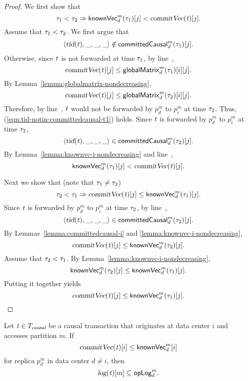 \begin{proof} \label{proof:heartbeat-forwarding-order}
  We first show that
  \[
    \realtime_{1} < \realtime_{2} \implies \knownVC^{m}_{d}(\realtime_{1})[j] < \commitVC(\tvar)[j].
  \]
  Assume that $\tau_{1} < \tau_{2}$.
  We first argue that
  \begin{align}
    \langle \textsl{tid}(\mathit{t}), \_, \_, \_ \rangle \notin {\sf committedCausal}^{m}_{d}(\tau_{1})[j].
    \label{eqn:tid-notin-committedcausal-t1}
  \end{align}
  Otherwise, since $\mathit{t}$ is not forwarded at time $\tau_{1}$,
  by line~\code{\ref{alg:unistore-replication}}{\ref{line:forward-txs}},
  \[
    \textsl{commitVec}(\mathit{t})[j] \le {\sf globalMatrix}^{m}_{d}(\tau_{1})[i][j].
  \]
  By Lemma~\ref{lemma:globalmatrix-nondecreasing},
  \[
    \textsl{commitVec}(\mathit{t})[j] \le {\sf globalMatrix}^{m}_{d}(\tau_{2})[i][j].
  \]
  Therefore, by line~\code{\ref{alg:unistore-replication}}{\ref{line:forward-txs}},
  $\mathit{t}$ would not be forwarded by $p^{m}_{d}$ to $p^{m}_{i}$ at time $\tau_{2}$.
  Thus, (\ref{eqn:tid-notin-committedcausal-t1}) holds.
  Since $\mathit{t}$ is forwarded by $p^{m}_{d}$ to $p^{m}_{i}$ at time $\tau_{2}$,
  \[
    \langle \textsl{tid}(\mathit{t}), \_, \_, \_ \rangle \in {\sf committedCausal}^{m}_{d}(\tau_{2})[j].
  \]
  By Lemma~\ref{lemma:knownvc-i-nondecreasing}
  and line~\code{\ref{alg:unistore-replication}}{\ref{line:replicate-precondition}},
  \[
    {\sf knownVec}^{m}_{d}(\tau_{1})[j] < \textsl{commitVec}(\mathit{t})[j].
  \]

  Next we show that (note that $\tau_{1} \neq \tau_{2}$)
  \[
    \realtime_{2} < \realtime_{1} \implies \commitVC(\tvar)[j] \le \knownVC^{m}_{d}(\realtime_{1})[j].
  \]
  Since $\mathit{t}$ is forwarded by $p^{m}_{d}$ to $p^{m}_{i}$ at time $\tau_{2}$,
  by line~\code{\ref{alg:unistore-replication}}{\ref{line:forward-txs}},
  \[
    \langle \textsl{tid}(\mathit{t}), \_, \_, \_ \rangle \in {\sf committedCausal}^{m}_{d}(\tau_{2})[j].
  \]
  By Lemmas~\ref{lemma:committedcausal-i} and \ref{lemma:knownvc-i-nondecreasing},
  \[
    \textsl{commitVec}(\mathit{t})[j] \le {\sf knownVec}^{m}_{d}(\tau_{2})[j].
  \]
  Assume that $\tau_{2} < \tau_{1}$.
  By Lemma~\ref{lemma:knownvc-i-nondecreasing},
  \[
    {\sf knownVec}^{m}_{d}(\tau_{2})[j] \le {\sf knownVec}^{m}_{d}(\tau_{1})[j].
  \]
  Putting it together yields
  \[
    \textsl{commitVec}(\mathit{t})[j] \le {\sf knownVec}^{m}_{d}(\tau_{1})[j].
  \]
\end{proof}

\begin{applemma} \label{lemma:replication-knownvc}
  Let $\mathit{t} \in T_{\textsl{causal}}$ be a causal transaction
  that originates at data center $i$ and accesses partition $m$.
  If
  \[
    \textsl{commitVec}(\mathit{t})[i] \le {\sf knownVec}^{m}_{d}[i]
  \]
  for replica $p^{m}_{d}$ in data center $d \neq i$,
  then
  \[
    \textsl{log}(\mathit{t})[m] \subseteq {\sf opLog}^{m}_{d}.
  \]
\end{applemma}

